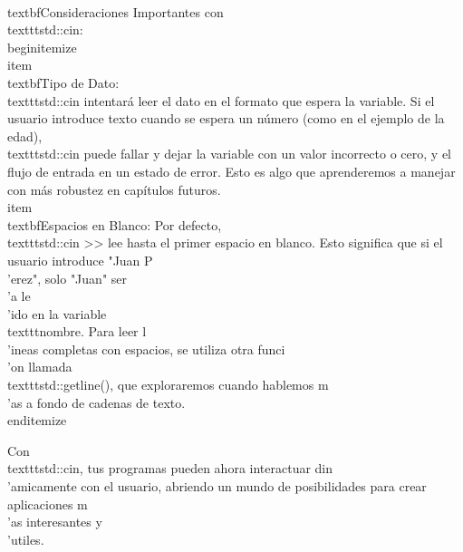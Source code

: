 \\textbf{Consideraciones Importantes con \\texttt{std::cin}:}
\\begin{itemize}
    \\item \\textbf{Tipo de Dato:} \\texttt{std::cin} intentará leer el dato en el formato que espera la variable. Si el usuario introduce texto cuando se espera un número (como en el ejemplo de la edad), \\texttt{std::cin} puede fallar y dejar la variable con un valor incorrecto o cero, y el flujo de entrada en un estado de error. Esto es algo que aprenderemos a manejar con más robustez en capítulos futuros.
    \\item \\textbf{Espacios en Blanco:} Por defecto, \\texttt{std::cin >>} lee hasta el primer espacio en blanco. Esto significa que si el usuario introduce "Juan P\\'erez", solo "Juan" ser\\'a le\\'ido en la variable \\texttt{nombre}. Para leer l\\'ineas completas con espacios, se utiliza otra funci\\'on llamada \\texttt{std::getline()}, que exploraremos cuando hablemos m\\'as a fondo de cadenas de texto.
\\end{itemize}

Con \\texttt{std::cin}, tus programas pueden ahora interactuar din\\'amicamente con el usuario, abriendo un mundo de posibilidades para crear aplicaciones m\\'as interesantes y \\'utiles.